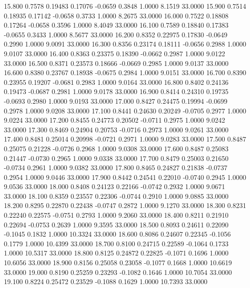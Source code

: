   15.800   0.7578   0.19483   0.17076  -0.0659   0.3848   1.0000   8.1519  33.0000
  15.900   0.7514   0.18935   0.17142  -0.0658   0.3733   1.0000   8.2675  33.0000
  16.000   0.7522   0.18808   0.17264  -0.0658   0.3596   1.0000   8.4049  33.0000
  16.100   0.7589   0.18840   0.17383  -0.0655   0.3433   1.0000   8.5677  33.0000
  16.200   0.8352   0.22975   0.17830  -0.0649   0.2990   1.0000   9.0091  33.0000
  16.300   0.8356   0.23174   0.18111  -0.0656   0.2988   1.0000   9.0107  33.0000
  16.400   0.8363   0.23375   0.18390  -0.0662   0.2987   1.0000   9.0122  33.0000
  16.500   0.8371   0.23573   0.18666  -0.0669   0.2985   1.0000   9.0137  33.0000
  16.600   0.8380   0.23767   0.18938  -0.0675   0.2984   1.0000   9.0151  33.0000
  16.700   0.8390   0.23955   0.19207  -0.0681   0.2983   1.0000   9.0164  33.0000
  16.800   0.8402   0.24136   0.19473  -0.0687   0.2981   1.0000   9.0178  33.0000
  16.900   0.8414   0.24310   0.19735  -0.0693   0.2980   1.0000   9.0193  33.0000
  17.000   0.8427   0.24475   0.19994  -0.0699   0.2978   1.0000   9.0208  33.0000
  17.100   0.8441   0.24630   0.20249  -0.0705   0.2977   1.0000   9.0224  33.0000
  17.200   0.8455   0.24773   0.20502  -0.0711   0.2975   1.0000   9.0242  33.0000
  17.300   0.8469   0.24904   0.20753  -0.0716   0.2973   1.0000   9.0261  33.0000
  17.400   0.8481   0.25014   0.20998  -0.0721   0.2971   1.0000   9.0283  33.0000
  17.500   0.8487   0.25075   0.21228  -0.0726   0.2968   1.0000   9.0308  33.0000
  17.600   0.8487   0.25083   0.21447  -0.0730   0.2965   1.0000   9.0338  33.0000
  17.700   0.8479   0.25003   0.21650  -0.0734   0.2961   1.0000   9.0382  33.0000
  17.800   0.8465   0.24827   0.21838  -0.0737   0.2954   1.0000   9.0446  33.0000
  17.900   0.8442   0.24541   0.22010  -0.0740   0.2945   1.0000   9.0536  33.0000
  18.000   0.8408   0.24123   0.22166  -0.0742   0.2932   1.0000   9.0671  33.0000
  18.100   0.8359   0.23557   0.22306  -0.0744   0.2910   1.0000   9.0885  33.0000
  18.200   0.8295   0.22870   0.22438  -0.0747   0.2872   1.0000   9.1270  33.0000
  18.300   0.8231   0.22240   0.22575  -0.0751   0.2793   1.0000   9.2060  33.0000
  18.400   0.8211   0.21910   0.22694  -0.0753   0.2639   1.0000   9.3595  33.0000
  18.500   0.8093   0.24611   0.22090  -0.1045   0.1832   1.0000  10.3324  33.0000
  18.600   0.8086   0.24607   0.22345  -0.1056   0.1779   1.0000  10.4399  33.0000
  18.700   0.8100   0.24715   0.22589  -0.1064   0.1733   1.0000  10.5317  33.0000
  18.800   0.8125   0.24872   0.22825  -0.1071   0.1696   1.0000  10.6056  33.0000
  18.900   0.8156   0.25058   0.23058  -0.1077   0.1668   1.0000  10.6619  33.0000
  19.000   0.8190   0.25259   0.23293  -0.1082   0.1646   1.0000  10.7054  33.0000
  19.100   0.8224   0.25472   0.23529  -0.1088   0.1629   1.0000  10.7393  33.0000
